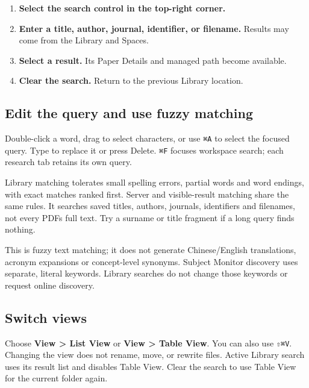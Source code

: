 \documentclass[10pt,letterpaper,oneside]{scrreprt}
\providecommand{\tightlist}{\setlength{\itemsep}{1pt}\setlength{\parskip}{0pt}}
\begin{document}
\begin{enumerate}
\tightlist
\item
  \textbf{Select the search control in the top-right corner.}
\item
  \textbf{Enter a title, author, journal, identifier, or filename.} Results may come from the Library and Spaces.
\item
  \textbf{Select a result.} Its Paper Details and managed path become available.
\item
  \textbf{Clear the search.} Return to the previous Library location.
\end{enumerate}

\subsection{Edit the query and use fuzzy matching}\label{edit-the-query-and-use-fuzzy-matching}

Double-click a word, drag to select characters, or use \texttt{{\symbolfont ⌘}}\texttt{A} to select the focused query. Type to replace it or press Delete. \texttt{{\symbolfont ⌘}}\texttt{F} focuses workspace search; each research tab retains its own query.

Library matching tolerates small spelling errors, partial words and word endings, with exact matches ranked first. Server and visible-result matching share the same rules. It searches saved titles, authors, journals, identifiers and filenames, not every PDF\textquotesingle s full text. Try a surname or title fragment if a long query finds nothing.

This is fuzzy text matching; it does not generate Chinese/English translations, acronym expansions or concept-level synonyms. Subject Monitor discovery uses separate, literal keywords. Library searches do not change those keywords or request online discovery.

\subsection{Switch views}\label{switch-views}

Choose \textbf{View \textgreater{} List View} or \textbf{View \textgreater{} Table View}. You can also use \texttt{{\symbolfont ⇧}}\texttt{{\symbolfont ⌘}}\texttt{V}. Changing the view does not rename, move, or rewrite files. Active Library search uses its result list and disables Table View. Clear the search to use Table View for the current folder again.
\end{document}
